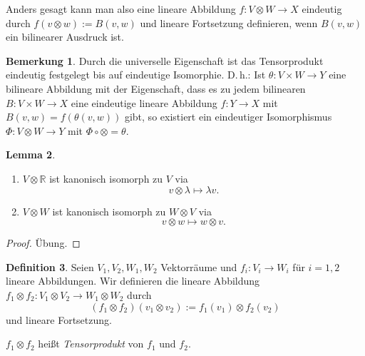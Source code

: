 \documentclass[a4paper]{scrbook}
\numberwithin{equation}{chapter}
\newcommand{\R}{\mathbb{R}}
\theoremstyle{definition}
\newtheorem{defn}{Definition}[section]
\newtheorem{lemma}[defn]{Lemma}
\newtheorem{bem}[defn]{Bemerkung}
\newcommand{\bewUeb}{\begin{proof}Übung.\end{proof}}
\begin{document}
Anders gesagt kann man also eine lineare Abbildung $f\colon V\otimes W\to X$ eindeutig durch $f(v\otimes w) := B(v,w)$ und lineare Fortsetzung definieren, wenn $B(v,w)$ ein bilinearer Ausdruck ist.
\begin{bem}
	Durch die universelle Eigenschaft ist das Tensorprodukt eindeutig festgelegt bis auf eindeutige Isomorphie. D.\,h.: Ist $\theta\colon V\times W\to Y$ eine bilineare Abbildung mit der Eigenschaft, dass es zu jedem bilinearen $B\colon V\times W \to X$ eine eindeutige lineare Abbildung $f\colon Y\to X$ mit $B(v,w) = f(\theta(v,w))$ gibt, so existiert ein eindeutiger Isomorphismus $\Phi\colon V\otimes W\to Y$ mit $\Phi\circ\otimes = \theta$.
\end{bem}
\begin{lemma}
	\begin{enumerate}[label=(\alph*)]
		\item $V\otimes\R$ ist kanonisch isomorph zu $V$ via
		\[v\otimes\lambda \mapsto \lambda v.\]
		\item $V\otimes W$ ist kanonisch isomorph zu $W\otimes V$ via
		\[v\otimes w \mapsto w\otimes v.\]
	\end{enumerate}
	\bewUeb
\end{lemma}

\begin{defn}
	Seien $V_1,V_2, W_1, W_2$ Vektorräume und $f_i\colon V_i \to W_i$ für $i=1,2$ lineare Abbildungen. Wir definieren die lineare Abbildung $f_1\otimes f_2 \colon V_1\otimes V_2 \to W_1\otimes W_2$ durch
	\[(f_1\otimes f_2)(v_1\otimes v_2) := f_1(v_1) \otimes f_2(v_2)\]
	und lineare Fortsetzung.

	$f_1\otimes f_2$ heißt \emph{Tensorprodukt} von $f_1$ und $f_2$.
\end{defn}
\end{document}
